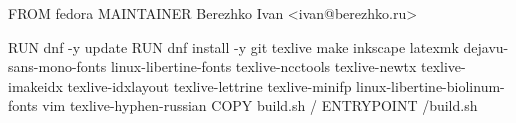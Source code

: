 FROM fedora
MAINTAINER Berezhko Ivan <ivan@berezhko.ru>

RUN dnf -y update
RUN dnf install -y git texlive make inkscape latexmk dejavu-sans-mono-fonts linux-libertine-fonts texlive-ncctools texlive-newtx texlive-imakeidx texlive-idxlayout texlive-lettrine texlive-minifp linux-libertine-biolinum-fonts vim texlive-hyphen-russian
COPY build.sh /
ENTRYPOINT /build.sh
